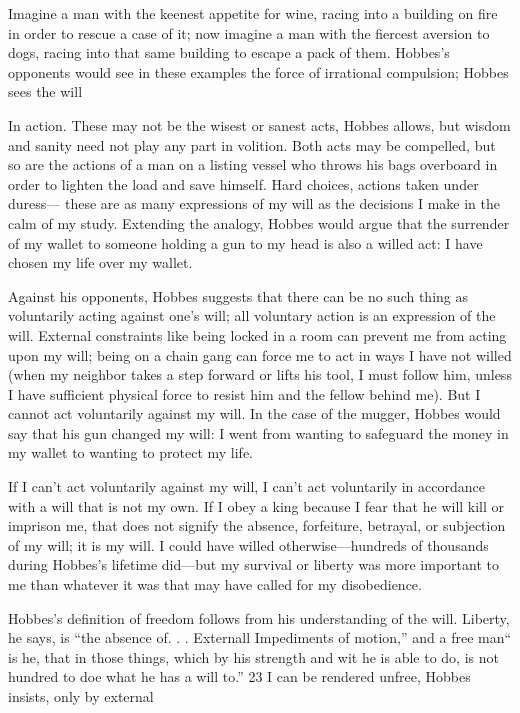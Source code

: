  \par 
Imagine a man with the keenest appetite for wine, racing into a building on fire in order to rescue a case of it; now imagine a man with the fiercest aversion to dogs, racing into that same building to escape a pack of them. Hobbes’s opponents would see in these examples the force of irrational compulsion; Hobbes sees the will
 \par 
In action. These may not be the wisest or sanest acts, Hobbes allows, but wisdom and sanity need not play any part in volition. Both acts may be compelled, but so are the actions of a man on a listing vessel who throws his bags overboard in order to lighten the load and save himself. Hard choices, actions taken under duress— these are as many expressions of my will as the decisions I make in the calm of my study. Extending the analogy, Hobbes would argue that the surrender of my wallet to someone holding a gun to my head is also a willed act: I have chosen my life over my wallet.
 \par 
Against his opponents, Hobbes suggests that there can be no such thing as voluntarily acting against one’s will; all voluntary action is an expression of the will. External constraints like being locked in a room can prevent me from acting upon my will; being on a chain gang can force me to act in ways I have not willed (when my neighbor takes a step forward or lifts his tool, I must follow him, unless I have sufficient physical force to resist him and the fellow behind me). But I cannot act voluntarily against my will. In the case of the mugger, Hobbes would say that his gun changed my will: I went from wanting to safeguard the money in my wallet to wanting to protect my life.
 \par 
If I can’t act voluntarily against my will, I can’t act voluntarily in accordance with a will that is not my own. If I obey a king because I fear that he will kill or imprison me, that does not signify the absence, forfeiture, betrayal, or subjection of my will; it is my will. I could have willed otherwise—hundreds of thousands during Hobbes’s lifetime did—but my survival or liberty was more important to me than whatever it was that may have called for my disobedience.
 \par 
Hobbes’s definition of freedom follows from his understanding of the will. Liberty, he says, is “the absence of. . . Externall Impediments of motion,” and a free man“ is he, that in those things, which by his strength and wit he is able to do, is not hundred to doe what he has a will to.” {\color{blue}23} I can be rendered unfree, Hobbes insists, only by external
